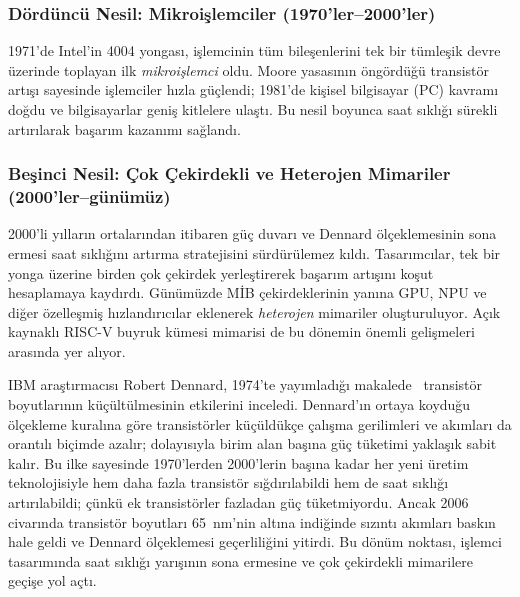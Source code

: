 \subsubsection*{Dördüncü Nesil: Mikroişlemciler (1970'ler--2000'ler)}
1971'de Intel'in 4004 yongası, işlemcinin tüm bileşenlerini tek bir tümleşik devre üzerinde toplayan ilk \emph{mikroişlemci} oldu. Moore yasasının öngördüğü transistör artışı sayesinde işlemciler hızla güçlendi; 1981'de kişisel bilgisayar (PC) kavramı doğdu ve bilgisayarlar geniş kitlelere ulaştı. Bu nesil boyunca saat sıklığı sürekli artırılarak başarım kazanımı sağlandı.

\subsubsection*{Beşinci Nesil: Çok Çekirdekli ve Heterojen Mimariler (2000'ler--günümüz)}
2000'li yılların ortalarından itibaren güç duvarı ve Dennard ölçeklemesinin sona ermesi saat sıklığını artırma stratejisini sürdürülemez kıldı. Tasarımcılar, tek bir yonga üzerine birden çok çekirdek yerleştirerek başarım artışını koşut hesaplamaya kaydırdı. Günümüzde MİB çekirdeklerinin yanına GPU, NPU ve diğer özelleşmiş hızlandırıcılar eklenerek \emph{heterojen} mimariler oluşturuluyor. Açık kaynaklı RISC-V buyruk kümesi mimarisi de bu dönemin önemli gelişmeleri arasında yer alıyor.

\begin{bilginot}
IBM araştırmacısı Robert Dennard, 1974'te yayımladığı makalede~\cite{dennard1974} transistör boyutlarının küçültülmesinin etkilerini inceledi. Dennard'ın ortaya koyduğu ölçekleme kuralına göre transistörler küçüldükçe çalışma gerilimleri ve akımları da orantılı biçimde azalır; dolayısıyla birim alan başına güç tüketimi yaklaşık sabit kalır. Bu ilke sayesinde 1970'lerden 2000'lerin başına kadar her yeni üretim teknolojisiyle hem daha fazla transistör sığdırılabildi hem de saat sıklığı artırılabildi; çünkü ek transistörler fazladan güç tüketmiyordu. Ancak 2006 civarında transistör boyutları 65~nm'nin altına indiğinde sızıntı akımları baskın hale geldi ve Dennard ölçeklemesi geçerliliğini yitirdi. Bu dönüm noktası, işlemci tasarımında saat sıklığı yarışının sona ermesine ve çok çekirdekli mimarilere geçişe yol açtı.
\end{bilginot}


